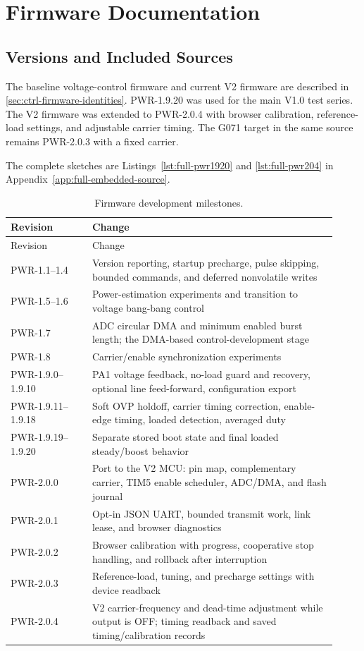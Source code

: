 \chapter{Firmware Documentation}
\label{app:firmware}

\section{Versions and Included Sources}

The baseline voltage-control firmware and current V2 firmware are described in \cref{sec:ctrl-firmware-identities}. PWR-1.9.20 was used for the main V1.0 test series. The V2 firmware was extended to PWR-2.0.4 with browser calibration, reference-load settings, and adjustable carrier timing. The G071 target in the same source remains PWR-2.0.3 with a fixed carrier.

The complete sketches are Listings~\ref{lst:full-pwr1920} and \ref{lst:full-pwr204} in Appendix~\ref{app:full-embedded-source}.

\begin{longtable}{@{}L{0.23\linewidth}L{0.69\linewidth}@{}}
\caption{Firmware development milestones.}
\label{tab:app-fw-milestones}\\
\toprule Revision & Change\\\midrule
\endfirsthead
\toprule Revision & Change\\\midrule
\endhead
PWR-1.1--1.4 & Version reporting, startup precharge, pulse skipping, bounded commands, and deferred nonvolatile writes\\
PWR-1.5--1.6 & Power-estimation experiments and transition to voltage bang-bang control\\
PWR-1.7 & ADC circular DMA and minimum enabled burst length; the DMA-based control-development stage\\
PWR-1.8 & Carrier/enable synchronization experiments\\
PWR-1.9.0--1.9.10 & PA1 voltage feedback, no-load guard and recovery, optional line feed-forward, configuration export\\
PWR-1.9.11--1.9.18 & Soft OVP holdoff, carrier timing correction, enable-edge timing, loaded detection, averaged duty\\
PWR-1.9.19--1.9.20 & Separate stored boot state and final loaded steady/boost behavior\\
PWR-2.0.0 & Port to the V2 MCU: pin map, complementary carrier, TIM5 enable scheduler, ADC/DMA, and flash journal\\
PWR-2.0.1 & Opt-in JSON UART, bounded transmit work, link lease, and browser diagnostics\\
PWR-2.0.2 & Browser calibration with progress, cooperative stop handling, and rollback after interruption\\
PWR-2.0.3 & Reference-load, tuning, and precharge settings with device readback\\
PWR-2.0.4 & V2 carrier-frequency and dead-time adjustment while output is OFF; timing readback and saved timing/calibration records\\
\bottomrule
\end{longtable}

